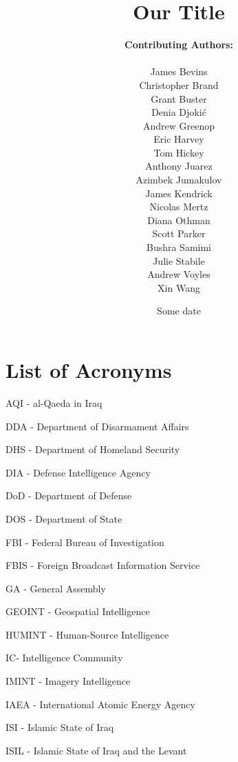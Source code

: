 \documentclass{report}
\title{Our Title}
\date{Some date}
\author{\textbf{Contributing Authors:}\\ \\
James	Bevins\\
Christopher	Brand \\
Grant	Buster\\
Denia	Djoki\'{c}\\
Andrew	Greenop\\
Eric	Harvey\\
Tom	Hickey\\
Anthony	Juarez\\
Azimbek	Jumakulov \\
James	Kendrick\\
Nicolas	Mertz \\
Diana	Othman \\
Scott	Parker \\
Bushra	Samimi \\
Julie	Stabile\\
Andrew	Voyles\\
Xin	Wang
}
\begin{document}
% 
% 
% 
% 
% 


\begin{titlepage}
\maketitle
\thispagestyle{empty}
\end{titlepage}

\pagestyle{fancyTOC}


\tableofcontents
\pagestyle{fancyTOC}




\listoffigures
\thispagestyle{fancyTOC}


\listoftables
\thispagestyle{fancyTOC}

\newpage


\pagestyle{fancyacronym}

\chapter*{List of Acronyms}
\pagestyle{fancyacronym}

AQI -  al-Qaeda in Iraq

DDA - Department of Disarmament Affairs

DHS - Department of Homeland Security

DIA - Defense Intelligence Agency

DoD - Department of Defense

DOS - Department of State

FBI - Federal Bureau of Investigation

FBIS - Foreign Broadcast Information Service

GA - General Assembly

GEOINT - Geospatial Intelligence

HUMINT - Human-Source Intelligence

IC- Intelligence Community

IMINT - Imagery Intelligence 

IAEA - International Atomic Energy Agency 

ISI - Islamic State of Iraq

ISIL - Islamic State of Iraq and the Levant
\end{document}
